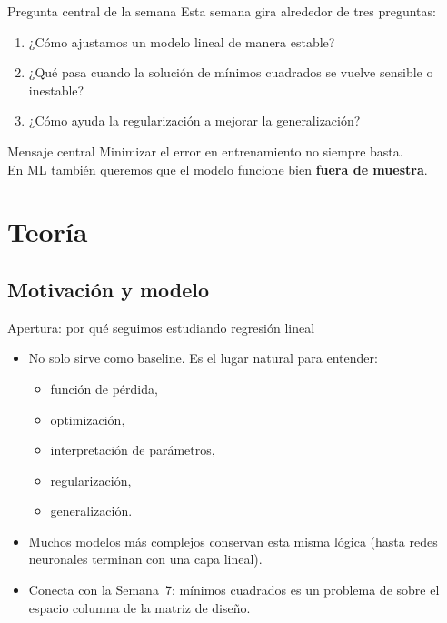 \begin{frame}{Pregunta central de la semana}
Esta semana gira alrededor de tres preguntas:
\begin{enumerate}\small
  \item ¿Cómo ajustamos un modelo lineal de manera estable?
  \item ¿Qué pasa cuando la solución de mínimos cuadrados se vuelve sensible o inestable?
  \item ¿Cómo ayuda la regularización a mejorar la generalización?
\end{enumerate}
\vspace{0.35em}
\begin{block}{Mensaje central}
\centering
\small
Minimizar el error en entrenamiento no siempre basta.\\
En ML también queremos que el modelo funcione bien \textbf{fuera de muestra}.
\end{block}
\end{frame}

\section[Teoría]{Teoría\label{sec:teoria-w09}}

\subsection{Motivación y modelo}

\begin{frame}{Apertura: por qué seguimos estudiando regresión lineal}
\begin{itemize}\small
  \item No solo sirve como baseline. Es el lugar natural para entender:
  \begin{itemize}\footnotesize
    \item función de pérdida,
    \item optimización,
    \item interpretación de parámetros,
    \item regularización,
    \item generalización.
  \end{itemize}
  \item Muchos modelos más complejos conservan esta misma lógica (hasta redes neuronales terminan con una capa lineal).
  \item Conecta con la Semana~7: mínimos cuadrados es un problema de  sobre el espacio columna de la matriz de diseño.
\end{itemize}
\end{frame}

